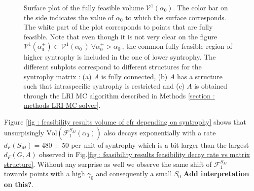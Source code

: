 \documentclass[12pt, titlepage]{report}
\begin{document}
\begin{figure}[h!]
\hspace{-0.1\linewidth}

\caption[caption for LOF]{Surface plot of the fully feasible volume $\mathcal{V}^1(\alpha_0)$. The color bar on the side indicates the value of $\alpha_0$ to which the surface corresponds. The white part of the plot corresponds to points that  are fully feasible. Note that even though it is not very clear on the figure $\mathcal{V}^1(\alpha_0^+) \subset \mathcal{V}^1(\alpha_0^-) \ \forall \alpha_0^+ > \alpha_0^-$, \ie the common fully feasible region of higher syntrophy is included in the one of lower syntrophy. The different subplots correspond to different structures for the syntrophy matrix : (a) $A$ is fully connected, (b) $A$ has a structure such that intraspecific syntrophy is restricted and (c) $A$ is obtained through the LRI MC algorithm described in Methods \ref{section : methods LRI MC solver}.} \label{fig : results feasibility cfv variation with syntrophy}
\end{figure}
Figure \ref{fig : feasibility results volume of cfr depending on syntrophy} shows that unsurpisingly $\text{Vol}\left(\mathcal{F}_1^{S_M}(\alpha_0)\right)$ also decays exponentially with a rate $d_F(S_M)=\num[scientific-notation=false]{480(50)}$ per unit of syntrophy which is a bit larger than the largest $d_F(G,A)$ observed in Fig.\ref{fig : feasibility results feasibility decay rate vs matrix structure}. Without any surprise as well we observe the same shift of $\mathcal{F}_1^{S_M}$ towards points with a high $\gamma_0$ and consequently a small $S_0$ \textbf{Add interpretation on this?}.
\end{document}
